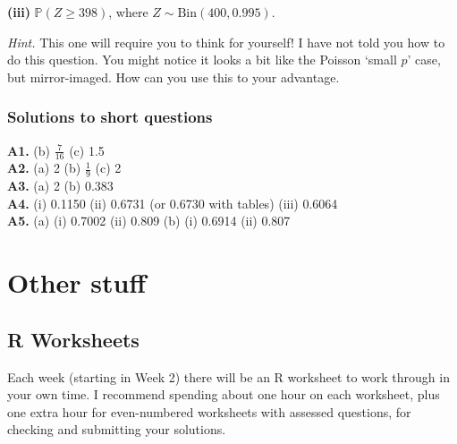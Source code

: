 \documentclass[
  a4paper,
]{book}
\theoremstyle{definition}
\theoremstyle{definition}
\theoremstyle{definition}
\theoremstyle{definition}
\theoremstyle{remark}
\begin{document}
\textbf{(iii)} \(\mathbb P(Z \geq 398)\), where \(Z \sim \mathrm{Bin}(400, 0.995)\).

\begin{myanswers}
\emph{Hint.} This one will require you to think for yourself! I have not told you how to do this question. You might notice it looks a bit like the Poisson `small \(p\)' case, but mirror-imaged. How can you use this to your advantage.

\end{myanswers}

\hypertarget{P5-short-sols}{%
\section*{Solutions to short questions}\label{P5-short-sols}}

\textbf{A1.} (b) \(\tfrac{7}{16}\) (c) 1.5\\
\textbf{A2.} (a) 2 (b) \(\tfrac19\) (c) 2\\
\textbf{A3.} (a) 2 (b) 0.383\\
\textbf{A4.} (i) 0.1150 (ii) 0.6731 (or 0.6730 with tables) (iii) 0.6064\\
\textbf{A5.} (a) (i) 0.7002 (ii) 0.809 (b) (i) 0.6914 (ii) 0.807

\hypertarget{part-other-stuff}{%
\part*{Other stuff}\label{part-other-stuff}}

\hypertarget{R}{%
\chapter*{R Worksheets}\label{R}}

Each week (starting in Week 2) there will be an R worksheet to work through in your own time. I recommend spending about one hour on each worksheet, plus one extra hour for even-numbered worksheets with assessed questions, for checking and submitting your solutions.
\end{document}
